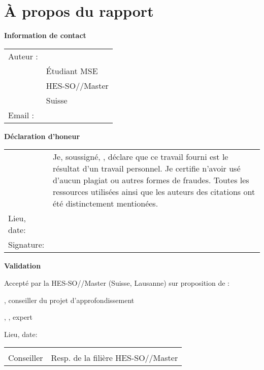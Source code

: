 \setlength{\parindent}{0pt}

\chapter*{À propos du rapport}

\vspace{\fill}

\textbf{Information de contact}

\begin{tabularx}{\textwidth}{N{2.5cm}X}
	Auteur :	 & \AuthorFirstName \ \AuthorLastName \\
	& Étudiant MSE \\
	& HES-SO//Master \\
	& Suisse \\
	Email : & \email{\AuthorEmail}
\end{tabularx}

\vspace{\fill}

\textbf{Déclaration d'honeur}

{\renewcommand{\arraystretch}{2}
\begin{tabularx}{\textwidth}{N{2.5cm}X}
	& Je, soussigné, \Author, déclare que ce travail fourni est le résultat d'un travail personnel. Je certifie n'avoir usé d'aucun plagiat ou autres formes de fraudes. Toutes les ressources utilisées ainsi que les auteurs des citations ont été distinctement mentionées. \\

	Lieu, date: & \underline{\hspace{7cm}} \\
	Signature: & \underline{\hspace{7cm}}
\end{tabularx}
}

\vspace{\fill}

\textbf{Validation}

Accepté par la HES-SO//Master (Suisse, Lausanne) sur proposition de :

\vspace{0.5cm}

\Advisor, conseiller du projet d’approfondissement

\Expert, \ExpertLab, expert

\vspace{1cm}

Lieu, date: \underline{\hspace{8cm}}

\vspace{3cm}

{ \renewcommand{\arraystretch}{1.5}
\begin{tabularx}{\textwidth}{X X}
	\Advisor  & \Dean\\
	Conseiller   & Resp. de la filière HES-SO//Master\\
\end{tabularx}
}

\setlength{\parindent}{15pt}

